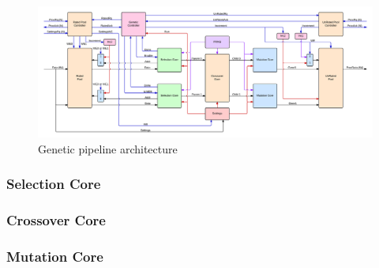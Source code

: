 \begin{figure}

  \centering
  \includegraphics[width=\textwidth]{fpga/fig/genetic_pipeline.png}
  \caption{Genetic pipeline architecture}
  \label{fpga:fig:genetic:genetic_pipeline}
\end{figure}





\subsubsection {Selection Core} \label{fpga:selection:ss:selection_core}
     \label{fpga:subsection:selection_core}

\subsubsection{Crossover Core} \label{fpga:crossover:ss:crossover_core}
     \label{fpga:subsection:crossover_core}

\subsubsection{Mutation Core}\label{fpga:mutation:ss:mutation_core}
     \label{fpga:subsection:mutation_core}


